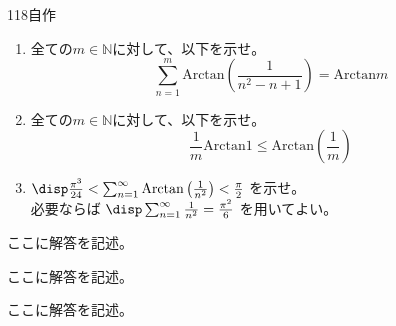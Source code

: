 \begin{prob}{118}{}{自作}
 \begin{enumerate}
  \item 全ての$m\in\mathbb{N}$に対して、以下を示せ。
	\[ \sum_{n=1}^m \mathrm{Arctan} \left(\frac{1}{n^2-n+1}\right) = \mathrm{Arctan} m \]
  \item 全ての$m\in\mathbb{N}$に対して、以下を示せ。
	\[ \frac{1}{m}\mathrm{Arctan}1 \le \mathrm{Arctan}\left(\frac{1}{m}\right) \]
  \item $\disp \frac{\pi^3}{24} < \sum_{n=1}^\infty \mathrm{Arctan}\left(\frac{1}{n^2}\right) < \frac{\pi}{2}$ を示せ。 \\
	必要ならば $\disp \sum_{n=1}^\infty \frac{1}{n^2}=\frac{\pi^2}{6}$ を用いてよい。
 \end{enumerate}
\end{prob}
ここに解答を記述。

ここに解答を記述。

ここに解答を記述。